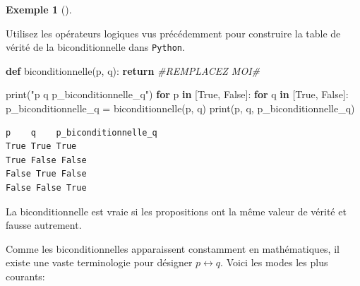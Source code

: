 \documentclass[
  letterpaper,
]{scrbook}
\newenvironment{Shaded}{\begin{snugshade}}{\end{snugshade}}
\newcommand{\BuiltInTok}[1]{\textcolor[rgb]{0.00,0.50,0.00}{#1}}
\newcommand{\CommentTok}[1]{\textcolor[rgb]{0.38,0.63,0.69}{\textit{#1}}}
\newcommand{\ControlFlowTok}[1]{\textcolor[rgb]{0.00,0.44,0.13}{\textbf{#1}}}
\newcommand{\KeywordTok}[1]{\textcolor[rgb]{0.00,0.44,0.13}{\textbf{#1}}}
\newcommand{\NormalTok}[1]{\textcolor[rgb]{0.00,0.44,0.13}{#1}}
\newcommand{\OperatorTok}[1]{\textcolor[rgb]{0.40,0.40,0.40}{#1}}
\newcommand{\StringTok}[1]{\textcolor[rgb]{0.25,0.44,0.63}{#1}}
\newcommand{\VariableTok}[1]{\textcolor[rgb]{0.10,0.09,0.49}{#1}}
\theoremstyle{plain}
\theoremstyle{definition}
\theoremstyle{definition}
\newtheorem{example}{Exemple}[chapter]
\theoremstyle{remark}
\begin{document}
\begin{example}[]\protect\hypertarget{exm-biconditionnelle-python}{}\label{exm-biconditionnelle-python}

Utilisez les opérateurs logiques vus précédemment pour construire la
table de vérité de la biconditionnelle dans \texttt{Python}.

\hypertarget{biconditionnelle-python-todo}{}
\begin{Shaded}
\begin{Highlighting}[]
\KeywordTok{def}\NormalTok{ biconditionnelle(p, q):}
    \ControlFlowTok{return} \CommentTok{\#REMPLACEZ MOI\#}

\BuiltInTok{print}\NormalTok{(}\StringTok{"p    q    p\_biconditionnelle\_q"}\NormalTok{)}
\ControlFlowTok{for}\NormalTok{ p }\KeywordTok{in}\NormalTok{ [}\VariableTok{True}\NormalTok{, }\VariableTok{False}\NormalTok{]:}
    \ControlFlowTok{for}\NormalTok{ q }\KeywordTok{in}\NormalTok{ [}\VariableTok{True}\NormalTok{, }\VariableTok{False}\NormalTok{]:}
\NormalTok{        p\_biconditionnelle\_q }\OperatorTok{=}\NormalTok{ biconditionnelle(p, q)}
        \BuiltInTok{print}\NormalTok{(p, q, p\_biconditionnelle\_q)}
\end{Highlighting}
\end{Shaded}

\hypertarget{biconditionnelle-python}{}
\begin{verbatim}
p    q    p_biconditionnelle_q
True True True
True False False
False True False
False False True
\end{verbatim}

\end{example}

\begin{tcolorbox}[enhanced jigsaw, colbacktitle=quarto-callout-important-color!10!white, toptitle=1mm, left=2mm, toprule=.15mm, opacityback=0, bottomrule=.15mm, breakable, coltitle=black, title=\textcolor{quarto-callout-important-color}{\faExclamation}\hspace{0.5em}{Important}, colframe=quarto-callout-important-color-frame, arc=.35mm, titlerule=0mm, rightrule=.15mm, opacitybacktitle=0.6, leftrule=.75mm, bottomtitle=1mm, colback=white]

La biconditionnelle est vraie si les propositions ont la même valeur de
vérité et fausse autrement.

\end{tcolorbox}

Comme les biconditionnelles apparaissent constamment en mathématiques,
il existe une vaste terminologie pour désigner \(p\leftrightarrow q\).
Voici les modes les plus courants:
\end{document}
